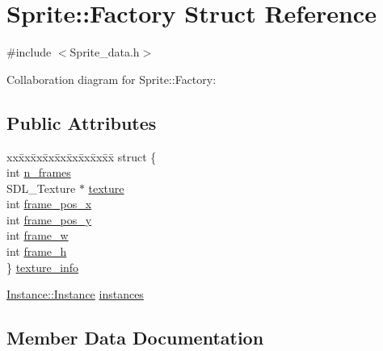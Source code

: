 \hypertarget{struct_sprite_1_1_factory}{}\section{Sprite\+:\+:Factory Struct Reference}
\label{struct_sprite_1_1_factory}


{\ttfamily \#include $<$Sprite\+\_\+data.\+h$>$}



Collaboration diagram for Sprite\+:\+:Factory\+:
\subsection*{Public Attributes}
\begin{DoxyCompactItemize}
\item 
\begin{tabbing}
xx\=xx\=xx\=xx\=xx\=xx\=xx\=xx\=xx\=\kill
struct \{\\
\>int \mbox{\hyperlink{struct_sprite_1_1_factory_a534d25967d63f70feefa2002c20c9e98}{n\_frames}}\\
\>SDL\_Texture $\ast$ \mbox{\hyperlink{struct_sprite_1_1_factory_af7d0d4d495f2278219e5f550611672a0}{texture}}\\
\>int \mbox{\hyperlink{struct_sprite_1_1_factory_a5d7c653f5b447c8a02a3dbad7a514bd0}{frame\_pos\_x}}\\
\>int \mbox{\hyperlink{struct_sprite_1_1_factory_a6c79fb1a0854e395ac4fee74efad936c}{frame\_pos\_y}}\\
\>int \mbox{\hyperlink{struct_sprite_1_1_factory_a294a32783087c3f6aa8c7c1406fa57de}{frame\_w}}\\
\>int \mbox{\hyperlink{struct_sprite_1_1_factory_ac93f5bb2b8d166712cdcb13c33d02319}{frame\_h}}\\
\} \mbox{\hyperlink{struct_sprite_1_1_factory_a4459fde931b806234fcb2d0ff03b28b7}{texture\_info}}\\

\end{tabbing}\item 
\mbox{\hyperlink{struct_sprite_1_1_instance_1_1_instance}{Instance\+::\+Instance}} \mbox{\hyperlink{struct_sprite_1_1_factory_aba2158fc28823256a9f4cbdf4d2b7351}{instances}}
\end{DoxyCompactItemize}


\subsection{Member Data Documentation}
\mbox{\label{struct_sprite_1_1_factory_ac93f5bb2b8d166712cdcb13c33d02319}} 
